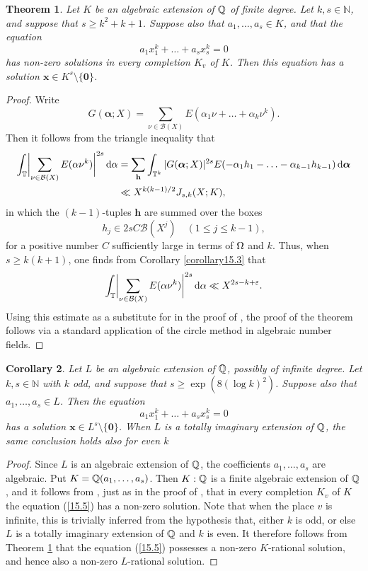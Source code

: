 \documentclass[12pt,reqno]{amsart}
\newtheorem{theorem}{Theorem}[section]
\newtheorem{corollary}[theorem]{Corollary}
\theoremstyle{definition}
\theoremstyle{remark}
\numberwithin{equation}{section}
\def\bfh{{\mathbf h}}
\def\bfx{{\mathbf x}}
\def\calB{{\mathcal B}} \def\calBtil{{\widetilde \calB}}
\def\dbN{{\mathbb N}} \def\dbO{{\mathbb O}} \def\dbP{{\mathbb P}}
\def\alp{{\alpha}} \def\bfalp{{\boldsymbol \alpha}}
\def\eps{\varepsilon}
\def\le{\leqslant} \def\ge{\geqslant} \def\pleq{\preccurlyeq} \def\ple{\prec}
\def\d{{\,{\rm d}}}
\begin{document}
\begin{theorem}\label{theorem15.6} Let $K$ be an algebraic extension of ${\mathbb Q}$ of finite 
degree. Let $k,s\in \dbN$, and suppose that $s\ge k^2+k+1$. Suppose also that 
$a_1,\ldots ,a_s\in K$, and that the equation
$$a_1x_1^k+\ldots +a_sx_s^k=0$$
has non-zero solutions in every completion $K_v$ of $K$. Then this equation has a solution 
$\bfx\in K^s\setminus \{{\mathbf 0}\}$.
\end{theorem}

\begin{proof} Write
$$G(\bfalp;X)=\sum_{\nu\in \calB(X)}E(\alp_1\nu+\ldots +\alp_k\nu^k).$$
Then it follows from the triangle inequality that
\begin{align*}
\int_\dbT \biggl| \sum_{\nu\in \calB(X)}E(\alp \nu^k)\biggr|^{2s}\d\alp &=
\sum_\bfh \int_{\dbT^k}|G(\bfalp;X)|^{2s}E(-\alp_1h_1-\ldots -\alp_{k-1}h_{k-1})\d\bfalp 
\\
&\ll X^{k(k-1)/2}J_{s,k}(X;K),
\end{align*}
in which the $(k-1)$-tuples $\bfh$ are summed over the boxes
$$h_j\in 2sC\calB(X^j)\quad (1\le j\le k-1),$$
for a positive number $C$ sufficiently large in terms of ${\Omega}$ and $k$. Thus, when 
$s\ge k(k+1)$, one finds from Corollary \ref{corollary15.3} that
$$\int_\dbT \biggl| \sum_{\nu\in \calB(X)}E(\alp \nu^k)\biggr|^{2s}\d\alp \ll 
X^{2s-k+\eps}.$$
Using this estimate as a substitute for \cite[Lemma 2]{Bir1961} in the proof of 
\cite[Theorem 3]{Bir1961}, the proof of the theorem follows via a standard application of 
the circle method in algebraic number fields.
\end{proof}

\begin{corollary}\label{corollary15.7} Let $L$ be an algebraic extension of ${\mathbb Q}$, possibly 
of infinite degree. Let $k,s\in \dbN$ with $k$ odd, and suppose that 
$s\ge \exp(8(\log k)^2)$. Suppose also that $a_1,\ldots ,a_s\in L$. Then the equation
\begin{equation}\label{15.5}
a_1x_1^k+\ldots +a_sx_s^k=0
\end{equation}
has a solution $\bfx\in L^s\setminus \{{\mathbf 0}\}$. When $L$ is a totally 
imaginary extension of ${\mathbb Q}$, the same conclusion holds also for even $k$
\end{corollary}

\begin{proof} Since $L$ is an algebraic extension of ${\mathbb Q}$, the coefficients 
$a_1,\ldots ,a_s$ are algebraic. Put $K={\mathbb Q}(a_1,\ldots ,a_s)$. Then $K:{\mathbb Q}$ is a finite 
algebraic extension of ${\mathbb Q}$, and it follows from \cite[Theorem 1]{BGR2008}, just as in 
the proof of \cite[Theorem 4.4]{Woo2016b}, that in every completion $K_v$ of $K$ the 
equation (\ref{15.5}) has a non-zero solution. Note that when the place $v$ is infinite, this 
is trivially inferred from the hypothesis that, either $k$ is odd, or else $L$ is a totally 
imaginary extension of ${\mathbb Q}$ and $k$ is even. It therefore follows from Theorem 
\ref{theorem15.6} that the equation (\ref{15.5}) possesses a non-zero $K$-rational 
solution, and hence also a non-zero $L$-rational solution.
\end{proof}
\end{document}

